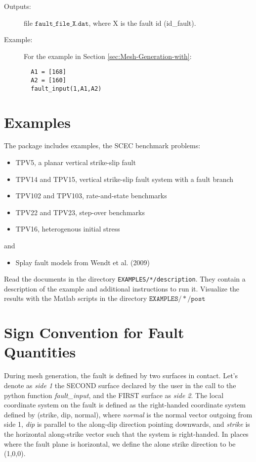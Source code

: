\begin{description}
\item [{Outputs:}] file $\mathtt{fault\_file\_X.dat}$, where X is the
fault id (id\_fault).
\item [{Example:}] For the example in Section \ref{sec:Mesh-Generation-with}:
{\footnotesize
\begin{verbatim}
  A1 = [168]
  A2 = [160]
  fault_input(1,A1,A2)
\end{verbatim}}
\end{description}

\section{Examples}

The package includes examples, the SCEC benchmark problems:
\begin{itemize}
\item TPV5, a planar vertical strike-slip fault
\item TPV14 and TPV15, vertical strike-slip fault system with a fault branch
\item TPV102 and TPV103, rate-and-state benchmarks
\item TPV22 and TPV23, step-over benchmarks
\item TPV16, heterogenous initial stress
\end{itemize}
and
\begin{itemize}
\item Splay fault models from Wendt et al. (2009)\\

\end{itemize}
Read the documents in the directory \texttt{EXAMPLES/*/description}.
They contain a description of the example and additional instructions
to run it. Visualize the results with the Matlab scripts in the directory
$\mathtt{EXAMPLES/*/post}$


\section{Sign Convention for Fault Quantities}\label{sec:Sign-Convention-for}

During mesh generation, the fault is defined by two surfaces in contact.
Let's denote as \textquotedbl{}\emph{side 1}\textquotedbl{} the SECOND
surface declared by the user in the call to the python function \textquotedbl{}\emph{fault\_input}\textquotedbl{},
and the FIRST surface as \textquotedbl{}\emph{side 2}\textquotedbl{}.
The local coordinate system on the fault is defined as the right-handed
coordinate system defined by (strike, dip, normal), where \textquotedbl{}\emph{normal}\textquotedbl{}
is the normal vector outgoing from side 1, \textquotedbl{}\emph{dip}\textquotedbl{}
is parallel to the along-dip direction pointing downwards, and \textquotedbl{}\emph{strike}\textquotedbl{}
is the horizontal along-strike vector such that the system is right-handed. In places where the fault plane is horizontal,
we define the alone strike direction to be (1,0,0).\\


